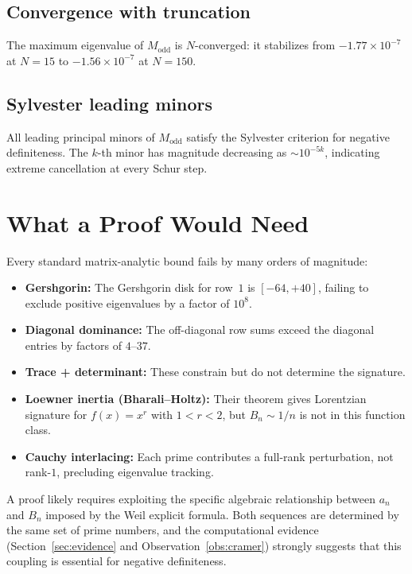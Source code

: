 \documentclass[11pt,a4paper]{article}
\begin{document}
\subsection{Convergence with truncation}

The maximum eigenvalue of $M_{\mathrm{odd}}$ is $N$-converged: it stabilizes from $-1.77 \times 10^{-7}$ at $N = 15$ to $-1.56 \times 10^{-7}$ at $N = 150$.

\subsection{Sylvester leading minors}

All leading principal minors of $M_{\mathrm{odd}}$ satisfy the Sylvester criterion for negative definiteness. The $k$-th minor has magnitude decreasing as $\sim 10^{-5k}$, indicating extreme cancellation at every Schur step.

\section{What a Proof Would Need}

Every standard matrix-analytic bound fails by many orders of magnitude:

\begin{itemize}
\item \textbf{Gershgorin:} The Gershgorin disk for row~$1$ is $[-64, +40]$, failing to exclude positive eigenvalues by a factor of $10^8$.
\item \textbf{Diagonal dominance:} The off-diagonal row sums exceed the diagonal entries by factors of $4$--$37$.
\item \textbf{Trace + determinant:} These constrain but do not determine the signature.
\item \textbf{Loewner inertia (Bharali--Holtz):} Their theorem gives Lorentzian signature for $f(x) = x^r$ with $1 < r < 2$, but $B_n \sim 1/n$ is not in this function class.
\item \textbf{Cauchy interlacing:} Each prime contributes a full-rank perturbation, not rank-$1$, precluding eigenvalue tracking.
\end{itemize}

A proof likely requires exploiting the specific algebraic relationship between $a_n$ and $B_n$ imposed by the Weil explicit formula. Both sequences are determined by the same set of prime numbers, and the computational evidence (Section~\ref{sec:evidence} and Observation~\ref{obs:cramer}) strongly suggests that this coupling is essential for negative definiteness.
\end{document}
